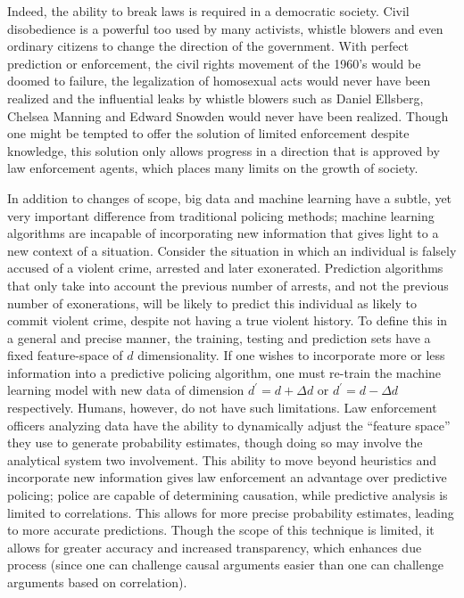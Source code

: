 \documentclass[12pt]{article} %
\begin{document}
Indeed, the ability to break laws is required in a democratic society. \cite{rsa_conference_2016} Civil disobedience is a powerful too used by many activists, whistle blowers and even ordinary citizens to change the direction of the government. With perfect prediction or enforcement, the civil rights movement of the 1960's would be doomed to failure, the legalization of homosexual acts would never have been realized and the influential leaks by whistle blowers such as Daniel Ellsberg, Chelsea Manning and Edward Snowden would never have been realized. Though one might be tempted to offer the solution of limited enforcement despite knowledge, this solution only allows progress in a direction that is approved by law enforcement agents, which places many limits on the growth of society.

In addition to changes of scope, big data and machine learning have a subtle, yet very important difference from traditional policing methods; machine learning algorithms are incapable of incorporating new information that gives light to a new context of a situation. Consider the situation in which an individual is falsely accused of a violent crime, arrested and later exonerated. Prediction algorithms that only take into account the previous number of arrests, and not the previous number of exonerations, will be likely to predict this individual as likely to commit violent crime, despite not having a true violent history. To define this in a general and precise manner, the training, testing and prediction sets have a fixed feature-space of $d$ dimensionality. If one wishes to incorporate more or less information into a predictive policing algorithm, one must re-train the machine learning model with new data of dimension $d^\prime = d + \Delta d$ or $d^\prime = d - \Delta d$ respectively. Humans, however, do not have such limitations. Law enforcement officers analyzing data have the ability to dynamically adjust the ``feature space'' they use to generate probability estimates, though doing so may involve the analytical system two involvement. This ability to move beyond heuristics and incorporate new information gives law enforcement an advantage over predictive policing; police are capable of determining causation, while predictive analysis is limited to correlations. This allows for more precise probability estimates, leading to more accurate predictions. Though the scope of this technique is limited, it allows for greater accuracy and increased transparency, which enhances due process (since one can challenge causal arguments easier than one can challenge arguments based on correlation). 
\end{document}
